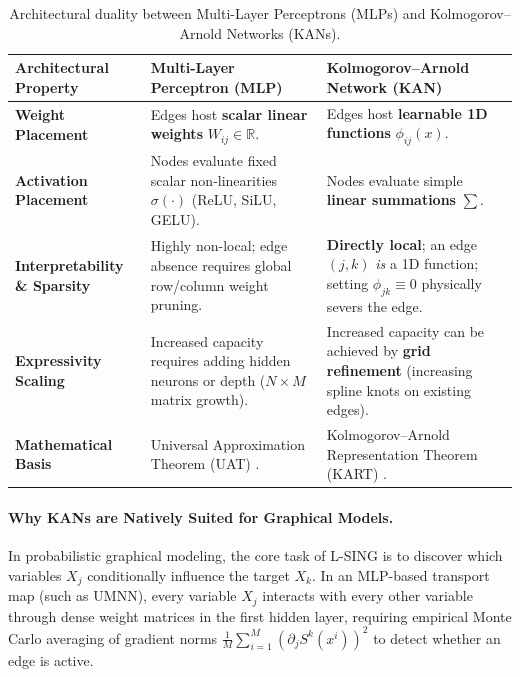 \documentclass[11pt,a4paper]{article}
\theoremstyle{plain}
\theoremstyle{definition}
\theoremstyle{remark}
\begin{document}
\begin{table}[htbp]
\centering
\small
\caption{Architectural duality between Multi-Layer Perceptrons (MLPs) and Kolmogorov--Arnold Networks (KANs).}
\label{tab:mlp_vs_kan_duality}
\begin{tabular}{p{} p{} p{}}
\toprule
\textbf{Architectural Property} & \textbf{Multi-Layer Perceptron (MLP)} & \textbf{Kolmogorov--Arnold Network (KAN)} \\
\midrule
\textbf{Weight Placement} & Edges host \textbf{scalar linear weights} $W_{ij} \in \mathbb{R}$. & Edges host \textbf{learnable 1D functions} $\phi_{ij}(x)$. \\
\addlinespace
\textbf{Activation Placement} & Nodes evaluate fixed scalar non-linearities $\sigma(\cdot)$ (ReLU, SiLU, GELU). & Nodes evaluate simple \textbf{linear summations} $\sum$. \\
\addlinespace
\textbf{Interpretability \& Sparsity} & Highly non-local; edge absence requires global row/column weight pruning. & \textbf{Directly local}; an edge $(j, k)$ \textit{is} a 1D function; setting $\phi_{jk} \equiv 0$ physically severs the edge. \\
\addlinespace
\textbf{Expressivity Scaling} & Increased capacity requires adding hidden neurons or depth ($N \times M$ matrix growth). & Increased capacity can be achieved by \textbf{grid refinement} (increasing spline knots on existing edges). \\
\addlinespace
\textbf{Mathematical Basis} & Universal Approximation Theorem (UAT) \cite{hornik1989multilayer}. & Kolmogorov--Arnold Representation Theorem (KART) \cite{kolmogorov1957representation,liu2024kan}. \\
\bottomrule
\end{tabular}
\end{table}

\paragraph{Why KANs are Natively Suited for Graphical Models.}
In probabilistic graphical modeling, the core task of L-SING is to discover which variables $X_j$ conditionally influence the target $X_k$. In an MLP-based transport map (such as UMNN), every variable $X_j$ interacts with every other variable through dense weight matrices in the first hidden layer, requiring empirical Monte Carlo averaging of gradient norms $\frac{1}{M} \sum_{i=1}^M (\partial_j S^k(x^i))^2$ to detect whether an edge is active. 
\end{document}

